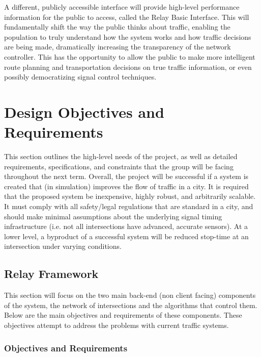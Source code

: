 \documentclass{article}
\begin{document}
A different, publicly accessible interface will provide high-level performance information for the public to access, called the Relay Basic Interface.
This will fundamentally shift the way the public thinks about traffic, enabling the population to truly understand how the system works and how traffic decisions are being made, dramatically increasing the transparency of the network controller.
This has the opportunity to allow the public to make more intelligent route planning and transportation decisions on true traffic information, or even possibly democratizing signal control techniques.

\section{Design Objectives and Requirements}

This section outlines the high-level needs of the project, as well as detailed requirements, specifications, and constraints that the group will be facing throughout the next term.
Overall, the project will be successful if a system is created that (in simulation) improves the flow of traffic in a city.
It is required that the proposed system be inexpensive, highly robust, and arbitrarily scalable.
It must comply with all safety/legal regulations that are standard in a city, and should make minimal assumptions about the underlying signal timing infrastructure (i.e. not all intersections have advanced, accurate sensors).
At a lower level, a byproduct of a successful system will be reduced stop-time at an intersection under varying conditions.\\

\subsection{Relay Framework}

This section will focus on the two main back-end (non client facing) components of the system, the network of intersections and the algorithms that control them.
Below are the main objectives and requirements of these components.
These objectives attempt to address the problems with current traffic systems.\\

\subsubsection{Objectives and Requirements}
\end{document}
